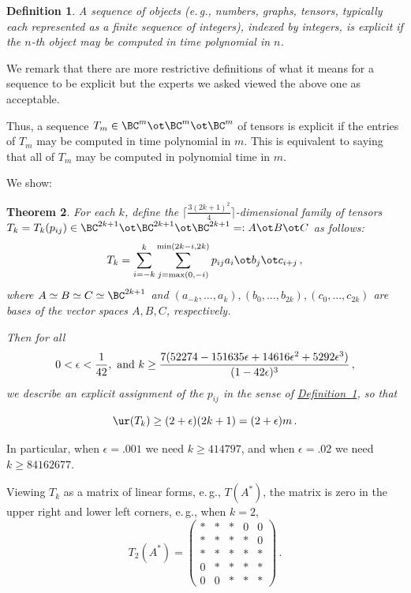 \documentclass[11pt]{article}
\newcommand{\expref}[2]{\texorpdfstring{\hyperref[#2]{#1~\ref{#2}}}{#1~\ref{#2}}}
\newtheorem{theorem}{Theorem}[section]
\newtheorem{definition}[theorem]{Definition}
\newcommand{\eg}{e.\,g.}
\begin{document}
\begin{definition} \label{explicitdef}
 A sequence of objects (\eg, numbers, graphs, tensors, typically each represented as a finite sequence of integers), indexed by integers, %
 is \emph{explicit}  if the $n$-th object may be computed in time polynomial in $n$. 
\end{definition}

We remark that there are more restrictive definitions of
what it means for a sequence to be explicit but the experts we asked viewed the above one as acceptable.



Thus, a 
 sequence $T_m\in \BC^m\ot \BC^m\ot \BC^m$ of tensors is explicit if the 
 entries of $T_m$  may be computed in time polynomial   in $m$. This is equivalent to saying  that all of $T_m$ may be computed in polynomial time in $m$. 

  We show:


\begin{theorem} \label{mainthm}
For each  $k$,    define the $\lceil \frac{3(2k+1)^2}{4}\rceil$-dimensional
family of tensors $T_k=T_k(p_{ij})\in \BC^{2k+1}\ot\BC^{2k+1}\ot\BC^{2k+1}=: A\ot B\ot C$ %
as follows:
\begin{equation}\label{Tk}
T_k=\sum_{i=-k}^k \sum_{j=\max(0,-i)}^{\min(2k-i,2k)}p_{i j} a_i\ot b_j\ot c_{i+j}\,,
\end{equation}
where $A\simeq B\simeq C\simeq \BC^{2k+1}$ and $(a_{-k},\dots, a_k),(b_{0},\dots, b_{2k}),(c_{0},\dots, c_{2k})$
are %
bases of the vector spaces
$A,B,C$,
respectively.  %

Then for all 
$$0<\epsilon<\frac 1{42}, {\rm \  and   \ }  k\geq
\frac{7 (52274 - 151635 \epsilon + 14616 \epsilon^2 + 5292 \epsilon^3)}{(1 - 42 \epsilon)^3 }\,,
$$
we describe  an explicit assignment of the $p_{ij}$ 
in the sense of \expref{Definition}{explicitdef}, so that

$$\ur(T_k)\geq (2+\epsilon)(2k+1)=(2+\epsilon)m\,.
$$

\end{theorem}


In particular,  when 
$\epsilon=.001$ we need $k\geq 414797$, %
%
 and when
 $\epsilon=.02$ we need
$k\geq 84162677$.

Viewing $T_k$ as a matrix of linear forms, \eg, $T(A^*)$, the matrix is zero in the upper right and lower left corners,
\eg, when $k=2$,
$$
T_2(A^*)=\begin{pmatrix}*&*&*&0&0\\  *&*&*&*&0\\ *&*&*&*&*\\  0&*&*&*&*\\   0&0&*&*&*\end{pmatrix}\,.
$$
\end{document}
